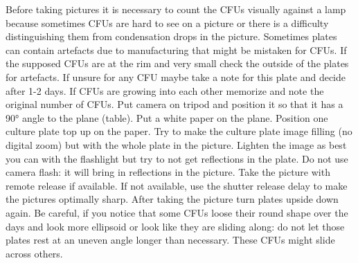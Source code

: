 \documentclass[hyperref]{labbook}
\begin{document}
Before taking pictures it is necessary to count the CFUs visually against a lamp because sometimes CFUs are hard to see on a picture or there is a difficulty distinguishing them from condensation drops in the picture. Sometimes plates can contain artefacts due to manufacturing that might be mistaken for CFUs. If the supposed CFUs are at the rim and very small check the outside of the plates for artefacts. If unsure for any CFU maybe take a note for this plate and decide after 1-2 days. If CFUs are growing into each other memorize and note the original number of CFUs. Put camera on tripod and position it so that it has a 90° angle to the plane (table). Put a white paper on the plane. Position one culture plate top up on the paper. Try to make the culture plate image filling (no digital zoom) but with the whole plate in the picture. Lighten the image as best you can with the flashlight but try to not get reflections in the plate. Do not use camera flash: it will bring in reflections in the picture. Take the picture with remote release if available. If not available, use the shutter release delay to make the pictures optimally sharp. After taking the picture turn plates upside down again. Be careful, if you notice that some CFUs loose their round shape over the days and look more ellipsoid or look like they are sliding along: do not let those plates rest at an uneven angle longer than necessary. These CFUs might slide across others.
\end{document}
